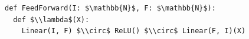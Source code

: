 \documentclass[border=10pt]{standalone}
\begin{document}
\begin{lstlisting}
def FeedForward(I: $\mathbb{N}$, F: $\mathbb{N}$):
  def $\\lambda$(X):
    Linear(I, F) $\\circ$ ReLU() $\\circ$ Linear(F, I)(X)
\end{lstlisting}
\end{document}
